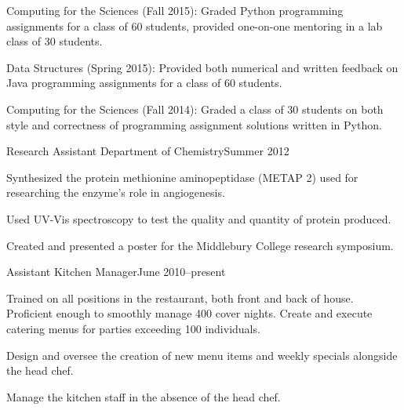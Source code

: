 \documentclass[10pt]{resume}
\begin{document}
{
    
    \item Computing for the Sciences (Fall 2015): Graded Python
    programming assignments for a class of 60 students, provided one-on-one
    mentoring in a lab class of 30 students.

    \item Data Structures (Spring 2015): Provided both numerical and
    written feedback on Java programming assignments for a class of 60
    students.

    \item Computing for the Sciences (Fall 2014): Graded a class of 30
    students on both style and correctness of programming assignment solutions
    written in Python. 
}

\expblock
{Research Assistant \textnormal{Department of Chemistry}}{Summer 2012}
{
    \item Synthesized the protein methionine aminopeptidase (METAP 2) used for
    researching the enzyme's role in angiogenesis.

    \item Used UV-Vis spectroscopy to test the quality and quantity of protein
    produced. 
    

    \item Created and presented a poster for the Middlebury College research
    symposium. 
}

\expblock
{Assistant Kitchen Manager}{June 2010--present}
{
    \item Trained on all positions in the restaurant, both front and back of
    house. Proficient enough to smoothly manage 400 cover nights. Create
    and execute catering menus for parties exceeding 100 individuals.
        
    \item Design and oversee the creation of new menu items and weekly
    specials alongside the head chef.

    \item Manage the kitchen staff in the absence of the head chef.
}
\end{document}
